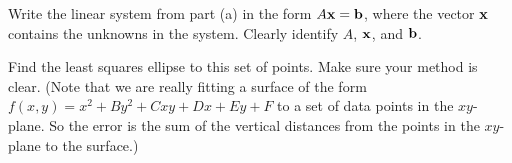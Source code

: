 \begin{pactivity}
\begin{comment}
\vs

\end{comment}

\item Write the linear system from part (a) in the form $A \mathbf{x} = \mathbf{b}$, where the vector $\mathbf{x}$ contains the unknowns in the system. Clearly identify $A$, $\mathbf{x}$, and $\mathbf{b}$.

\begin{comment}

\vs
 
\solution We can rewrite this as the system $A \vx = \vb$, with $A= \left[ \begin{array}{crrrc} 4&0&0&2&1\\1&2&2&1&1 \\ 1&-1&1&-1&1 \\ 4&2&-1&-2&1\\ 1&-3&-3&1&1 \\ 1&1&-1&-1&1 \end{array} \right]$, $\vx = \left[ \begin{array}{c}B\\C\\D\\E\\F \end{array} \right]$, and $\vb = \left[ \begin{array}{r} 0\\-4\\-1\\-1\\-9\\-1 \end{array} \right]$. 

\vs

\end{comment}

\item Find the least squares ellipse to this set of points. Make sure your method is clear. (Note that we are really fitting a surface of the form $f(x,y) = x^2 + By^2 + Cxy + Dx + Ey + F$ to a set of data points in the $xy$-plane. So the error is the sum of the vertical distances from the points in the $xy$-plane to the surface.)


\ea

\end{pactivity}

